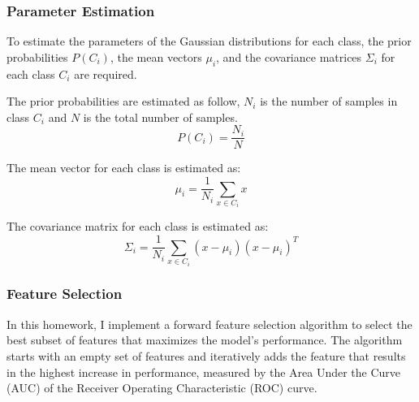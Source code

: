 \documentclass[12pt,a4paper]{article}
\begin{document}
\subsubsection{Parameter Estimation}
To estimate the parameters of the Gaussian distributions for each class, the prior probabilities $P(C_i)$, the mean vectors $\mu_i$, and the covariance matrices $\Sigma_i$ for each class $C_i$ are required.

The prior probabilities are estimated as follow, $N_i$ is the number of samples in class $C_i$ and $N$ is the total number of samples.
\begin{equation}
P(C_i) = \frac{N_i}{N}
\end{equation}

The mean vector for each class is estimated as:
\begin{equation}
\mu_i = \frac{1}{N_i} \sum_{x \in C_i} x
\end{equation}

The covariance matrix for each class is estimated as:
\begin{equation}
\Sigma_i = \frac{1}{N_i} \sum_{x \in C_i} (x - \mu_i)(x - \mu_i)^T
\end{equation}

\subsubsection{Feature Selection}
In this homework, I implement a forward feature selection algorithm to select the best subset of features that maximizes the model's performance. The algorithm starts with an empty set of features and iteratively adds the feature that results in the highest increase in performance, measured by the Area Under the Curve (AUC) of the Receiver Operating Characteristic (ROC) curve.
\end{document}
